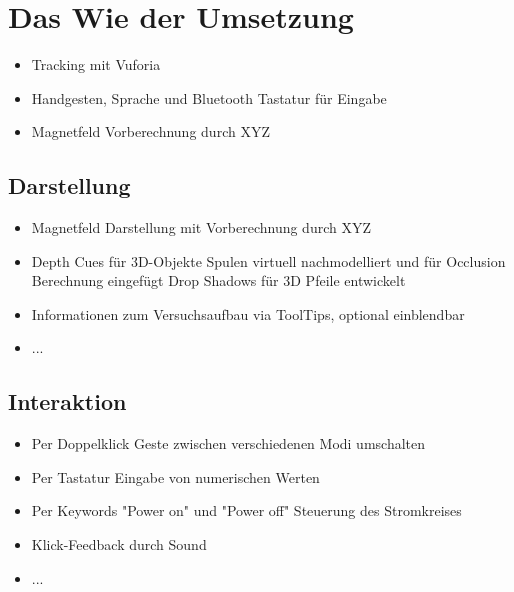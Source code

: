 \section{Das Wie der Umsetzung}
\label{sec-5}

\begin{itemize}
	\item Tracking mit Vuforia
	\item Handgesten, Sprache und Bluetooth Tastatur für Eingabe
	\item Magnetfeld Vorberechnung durch XYZ
\end{itemize}

\subsection{Darstellung}
\begin{itemize}
	\item Magnetfeld Darstellung mit Vorberechnung durch XYZ
	\item Depth Cues für 3D-Objekte
	\subitem Spulen virtuell nachmodelliert und für Occlusion Berechnung eingefügt
	\subitem Drop Shadows für 3D Pfeile entwickelt
	\item Informationen zum Versuchsaufbau via ToolTips, optional einblendbar
	\item ...
\end{itemize}

\subsection{Interaktion}
\begin{itemize}
	\item Per Doppelklick Geste zwischen verschiedenen Modi umschalten
	\item Per Tastatur Eingabe von numerischen Werten
	\item Per Keywords "Power on" und "Power off" Steuerung des Stromkreises
	\item Klick-Feedback durch Sound
	\item ...
\end{itemize}
